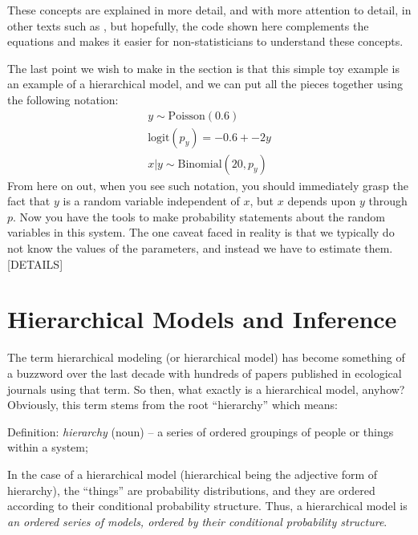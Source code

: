 These concepts are explained in more detail, and with more attention
to detail, in other texts such as \citet{casella_berger:2002}, but hopefully, the
code shown here complements the equations and makes it easier for
non-statisticians to understand these concepts.

The last point we wish
to make in the section is that this simple toy example is an example
of a hierarchical model, and we can put all the pieces together using
the following notation:
\begin{gather}
  y \sim \text{Poisson}(0.6) \\
  \text{logit}(p_y) = -0.6 + -2y \\
  x|y \sim \text{Binomial}(20, p_y)
\end{gather}
From here on out, when you see such notation, you should immediately
grasp the fact that $y$ is a random variable independent of $x$, but
$x$ depends upon $y$ through $p$. Now you have the tools to make
probability statements about the random variables in this system. The
one caveat faced in reality is that we typically do not know the
values of the parameters, and instead we have to estimate them.[DETAILS]









\section{Hierarchical Models and Inference}

The term hierarchical modeling (or hierarchical model) has become
something of a buzzword over the last decade with hundreds of papers
published in ecological journals using that term.  So then, what
exactly is a hierarchical model, anyhow? Obviously, this term stems
from the root ``hierarchy'' which means:

\vspace{.1in}

{\flushleft
Definition: {\it hierarchy} (noun) -- a series of ordered groupings of people or things within a system;
}

\vspace{.1in}

In the case of a hierarchical model (hierarchical being the adjective
form of hierarchy), the ``things'' are probability distributions, and
they are ordered according to their conditional probability structure.
Thus, a hierarchical model is {\it an ordered series of models,
  ordered by their conditional probability structure}.

